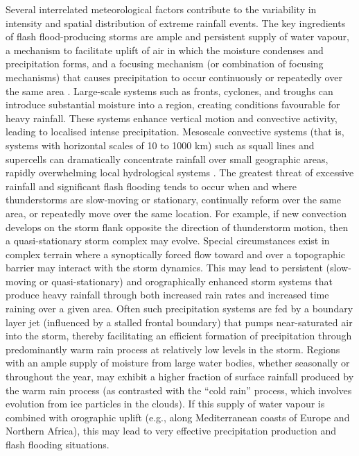 Several interrelated meteorological factors contribute to the variability in intensity and spatial distribution of extreme rainfall events. The key ingredients of flash flood-producing storms are ample and persistent supply of water vapour, a mechanism to facilitate uplift of air in which the moisture condenses and precipitation forms, and a focusing mechanism (or combination of focusing mechanisms) that causes precipitation to occur continuously or repeatedly over the same area \citep{Doswell_1996}. Large-scale systems such as fronts, cyclones, and troughs can introduce substantial moisture into a region, creating conditions favourable for heavy rainfall. These systems enhance vertical motion and convective activity, leading to localised intense precipitation. Mesoscale convective systems (that is, systems with horizontal scales of 10 to 1000 km) such as squall lines and supercells can dramatically concentrate rainfall over small geographic areas, rapidly overwhelming local hydrological systems \citep{Maddox_1979, Doswell_1996, Davis_2001}. The greatest threat of excessive rainfall and significant flash flooding tends to occur when and where thunderstorms are slow-moving or stationary, continually reform over the same area, or repeatedly move over the same location. For example, if new convection develops on the storm flank opposite the direction of thunderstorm motion, then a quasi-stationary storm complex may evolve. Special circumstances exist in complex terrain where a synoptically forced flow toward and over a topographic barrier may interact with the storm dynamics. This may lead to persistent (slow-moving or quasi-stationary) and orographically enhanced storm systems that produce heavy rainfall through both increased rain rates and increased time raining over a given area. Often such precipitation systems are fed by a boundary layer jet (influenced by a stalled frontal boundary) that pumps near-saturated air into the storm, thereby facilitating an efficient formation of precipitation through predominantly warm rain process at relatively low levels in the storm. Regions with an ample supply of moisture from large water bodies, whether seasonally or throughout the year, may exhibit a higher fraction of surface rainfall produced by the warm rain process (as contrasted with the “cold rain” process, which involves evolution from ice particles in the clouds). If this supply of water vapour is combined with orographic uplift (e.g., along Mediterranean coasts of Europe and Northern Africa), this may lead to very effective precipitation production and flash flooding situations.

